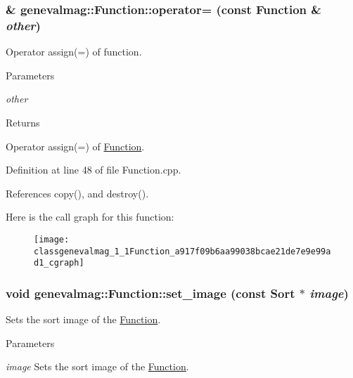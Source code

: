 \hypertarget{classgenevalmag_1_1Function_a917f09b6aa99038bcae21de7e9e99ad1}{
\subsubsection[{operator=}]{ \& genevalmag::Function::operator= (const {\bf Function} \& {\em other})}}
\label{classgenevalmag_1_1Function_a917f09b6aa99038bcae21de7e9e99ad1}
Operator assign(=) of function. 
\begin{DoxyParams}{Parameters}
\item[{\em other}]\end{DoxyParams}
\begin{DoxyReturn}{Returns}

\end{DoxyReturn}
Operator assign(=) of \hyperlink{classgenevalmag_1_1Function}{Function}. 

Definition at line 48 of file Function.cpp.



References copy(), and destroy().



Here is the call graph for this function:\nopagebreak
\begin{figure}[H]
\begin{center}
\leavevmode
\texttt{[image: classgenevalmag\_1\_1Function\_a917f09b6aa99038bcae21de7e9e99ad1\_cgraph]}
\end{center}
\end{figure}


\hypertarget{classgenevalmag_1_1Function_ab82067b5dfd6d143a12defbf6eb52d56}{
\subsubsection[{set\_\-image}]{\setlength{\rightskip}{0pt plus 5cm}void genevalmag::Function::set\_\-image (const {\bf Sort} $\ast$ {\em image})}}
\label{classgenevalmag_1_1Function_ab82067b5dfd6d143a12defbf6eb52d56}
Sets the sort image of the \hyperlink{classgenevalmag_1_1Function}{Function}. 
\begin{DoxyParams}{Parameters}
\item[{\em image}]Sets the sort image of the \hyperlink{classgenevalmag_1_1Function}{Function}. \end{DoxyParams}


